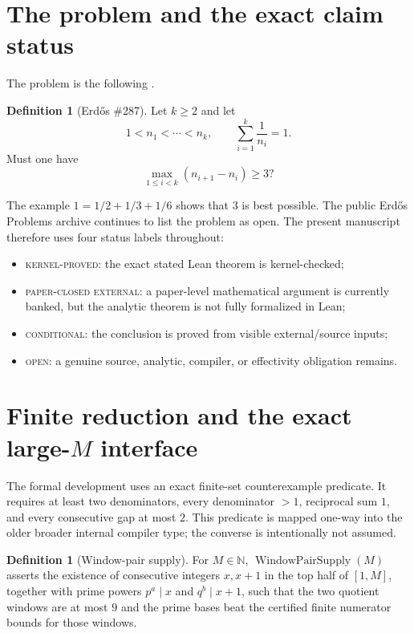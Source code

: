 \documentclass[11pt]{article}
\theoremstyle{definition}
\newtheorem{definition}[theorem]{Definition}
\newcommand{\N}{\mathbb N}
\newcommand{\1}{\mathbf 1}
\newcommand{\WPS}{\operatorname{WindowPairSupply}}
\newcommand{\paperclosed}{\textsc{paper-closed external}}
\newcommand{\kernelproved}{\textsc{kernel-proved}}
\newcommand{\conditional}{\textsc{conditional}}
\newcommand{\openstatus}{\textsc{open}}
\begin{document}
\tableofcontents

\section{The problem and the exact claim status}

The problem is the following \cite{ErdosGraham1980,ErdosProblems287}.

\begin{definition}[Erd\H{o}s \#287]
Let $k\ge2$ and let
\[
1<n_1<\cdots<n_k,\qquad \sum_{i=1}^k\frac1{n_i}=1.
\]
Must one have
\[
\max_{1\le i<k}(n_{i+1}-n_i)\ge3?
\]
\end{definition}

The example $1=1/2+1/3+1/6$ shows that $3$ is best possible. The public Erd\H{o}s Problems archive continues to list the problem as open. The present manuscript therefore uses four status labels throughout:
\begin{itemize}[leftmargin=*]
\item \kernelproved: the exact stated Lean theorem is kernel-checked;
\item \paperclosed: a paper-level mathematical argument is currently banked, but the analytic theorem is not fully formalized in Lean;
\item \conditional: the conclusion is proved from visible external/source inputs;
\item \openstatus: a genuine source, analytic, compiler, or effectivity obligation remains.
\end{itemize}

\section{Finite reduction and the exact large-$M$ interface}

The formal development uses an exact finite-set counterexample predicate. It requires at least two denominators, every denominator $>1$, reciprocal sum $1$, and every consecutive gap at most $2$. This predicate is mapped one-way into the older broader internal compiler type; the converse is intentionally not assumed.

\begin{definition}[Window-pair supply]
For $M\in\N$, $\WPS(M)$ asserts the existence of consecutive integers $x,x+1$ in the top half of $[1,M]$, together with prime powers $p^a\mid x$ and $q^b\mid x+1$, such that the two quotient windows are at most $9$ and the prime bases beat the certified finite numerator bounds for those windows.
\end{definition}
\end{document}
